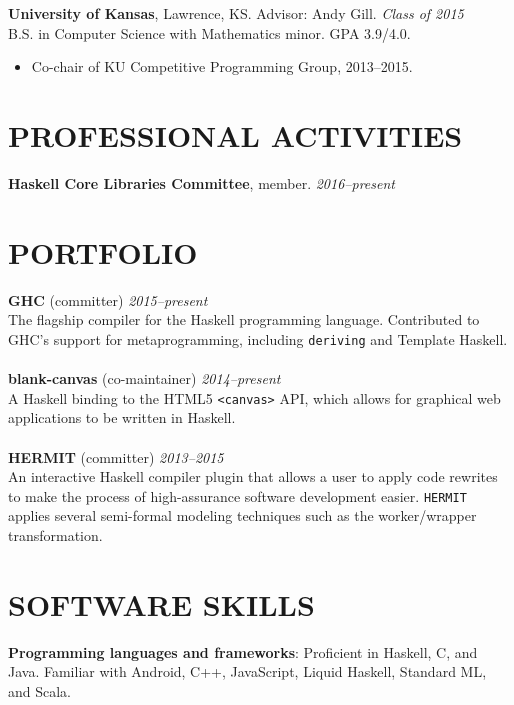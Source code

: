 \documentclass{res}
\begin{document}
\begin{resume}
     \textbf{University of Kansas}, Lawrence, KS. Advisor: Andy Gill. \hfill \textit{Class of 2015} \\
    B.S. in Computer Science with Mathematics minor. GPA 3.9/4.0.
    \begin{itemize}
     \item Co-chair of KU Competitive Programming Group, 2013--2015.
    \end{itemize}


\section{PROFESSIONAL ACTIVITIES}
    \textbf{Haskell Core Libraries Committee}, member. \hfill \textit{2016--present}

\section{PORTFOLIO}
    \textbf{GHC} (committer) \hfill \textit{2015--present} \\
    The flagship compiler for the Haskell programming language. Contributed to GHC's support for metaprogramming, including \texttt{deriving} and Template Haskell. \\ \\
    \textbf{blank-canvas} (co-maintainer) \hfill \textit{2014--present} \\
    A Haskell binding to the HTML5 \texttt{<canvas>} API, which allows for graphical web applications to be written in Haskell. \\ \\
    \textbf{HERMIT} (committer) \hfill \textit{2013--2015} \\
    An interactive Haskell compiler plugin that allows a user to apply code rewrites to make the process of high-assurance software development easier. \verb+HERMIT+ applies several semi-formal modeling techniques such as the worker/wrapper transformation.

\section{SOFTWARE SKILLS}
    \textbf{Programming languages and frameworks}: Proficient in Haskell, C, and Java. Familiar with Android, C++, JavaScript, Liquid Haskell, Standard ML, and Scala.
\end{resume}
\end{document}
